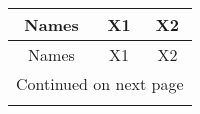 

\begin{longtable}{ccc}
  \toprule
  \toprule
  Names & X1 & X2\\
  \midrule
  \endfirsthead

  \toprule
  \toprule
  Names & X1 & X2\\

  \midrule
  \endhead

  \midrule
  \multicolumn{3}{r}{Continued on next page} \\
  \midrule
  \endfoot

  \bottomrule
  \endlastfoot 


\end{longtable}
